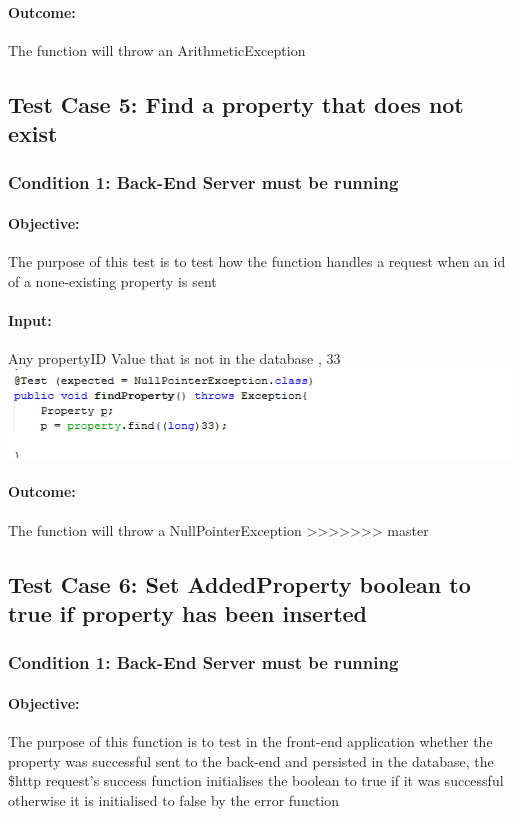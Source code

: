 \documentclass[a4paper,12pt]{article}
\begin{document}
\paragraph{Outcome: } The function will throw an ArithmeticException

\subsection{Test Case 5: Find a property that does not exist}
\subsubsection{Condition 1: Back-End Server must be running}
\paragraph{Objective:}The purpose of this test is to test how the function handles a request when an id of a none-existing property is sent
\paragraph{Input:} Any propertyID Value that is not in the database , 33\\
\includegraphics[width=1\textwidth]{./Images/input5.png}

\paragraph{Outcome: } The function will throw a NullPointerException
>>>>>>> master

\subsection{Test Case 6: Set AddedProperty boolean to true if property has been inserted}
\subsubsection{Condition 1: Back-End Server must be running}
\paragraph{Objective:}The purpose of this function is to test in the front-end application whether the property was successful sent to the back-end and persisted in the database, the \$http request's success function initialises the boolean to true if it was successful otherwise it is initialised to false by the error function
\end{document}
